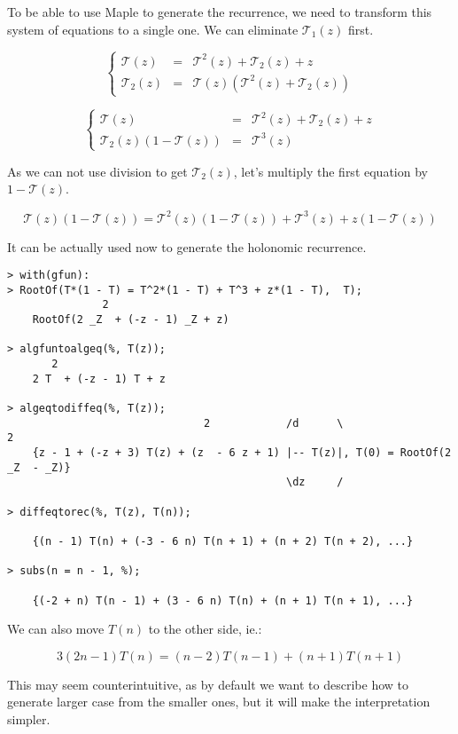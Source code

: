\documentclass[final]{article}
\theoremstyle{definition}
\theoremstyle{remark}
\newcommand{\gf}[1]{\ensuremath{\mathcal{#1}}}
\begin{document}
To be able to use Maple to generate the recurrence, we need to transform this system of equations to a single one. We can eliminate \(\gf{T}_1(z)\) first.

\[\left\{\begin{array}{rcl}
            \gf{T}(z) &=& \gf{T}^2(z) + \gf{T}_2(z) + z\\
            \gf{T}_2(z) &=& \gf{T}(z)(\gf{T}^2(z) + \gf{T}_2(z))
\end{array}\right.\]

\[\left\{\begin{array}{rcl}
            \gf{T}(z) &=& \gf{T}^2(z) + \gf{T}_2(z) + z\\
            \gf{T}_2(z)(1 - \gf{T}(z)) &=& \gf{T}^3(z)
\end{array}\right.\]

As we can not use division to get \(\gf{T}_2(z)\), let's multiply the first equation by \(1 - \gf{T}(z)\).

\[\gf{T}(z)(1 - \gf{T}(z)) = \gf{T}^2(z)(1 - \gf{T}(z)) + \gf{T}^3(z) + z(1 - \gf{T}(z))\]

It can be actually used now to generate the holonomic recurrence.

\begin{lstlisting}
> with(gfun):
> RootOf(T*(1 - T) = T^2*(1 - T) + T^3 + z*(1 - T),  T);
               2
    RootOf(2 _Z  + (-z - 1) _Z + z)

> algfuntoalgeq(%, T(z));
       2
    2 T  + (-z - 1) T + z

> algeqtodiffeq(%, T(z));
                               2            /d      \                    2
    {z - 1 + (-z + 3) T(z) + (z  - 6 z + 1) |-- T(z)|, T(0) = RootOf(2 _Z  - _Z)}
                                            \dz     /

> diffeqtorec(%, T(z), T(n));

    {(n - 1) T(n) + (-3 - 6 n) T(n + 1) + (n + 2) T(n + 2), ...}

> subs(n = n - 1, %);

    {(-2 + n) T(n - 1) + (3 - 6 n) T(n) + (n + 1) T(n + 1), ...}
\end{lstlisting}

We can also move \(T(n)\) to the other side, ie.:

\[3 (2 n - 1) T(n) = (n - 2) T(n - 1) + (n + 1) T(n + 1)\]

This may seem counterintuitive, as by default we want to describe how to generate larger case from the smaller ones, but it will make the interpretation simpler.
\end{document}
